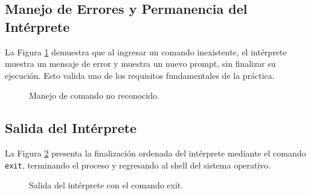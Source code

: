     \subsection{Manejo de Errores y Permanencia del Intérprete}
        La Figura \ref{fig:error_cmd} demuestra que al ingresar un comando inexistente, el intérprete muestra un mensaje de error y muestra un nuevo prompt, sin finalizar su ejecución. Esto valida uno de los requisitos fundamentales de la práctica.
        \begin{figure}[!h]
            \centering
            \caption{Manejo de comando no reconocido.}
            \label{fig:error_cmd}
        \end{figure}

    \subsection{Salida del Intérprete}
        La Figura \ref{fig:exit} presenta la finalización ordenada del intérprete mediante el comando \texttt{exit}, terminando el proceso y regresando al shell del sistema operativo.
        \begin{figure}[!h]
            \centering
            \caption{Salida del intérprete con el comando exit.}
            \label{fig:exit}
        \end{figure}
